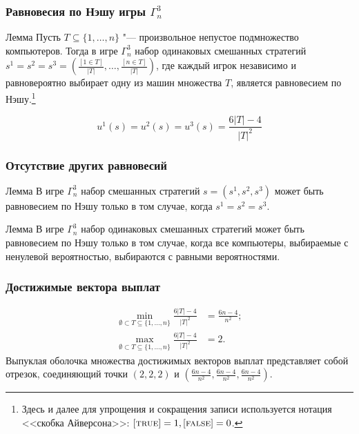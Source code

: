 \begin{frame}
	\frametitle{Равновесия по Нэшу игры $\Gamma^3_n$}
	\begin{block}{Лемма}
		Пусть $T \subseteq \{1, \ldots, n\}$ "--- произвольное непустое подмножество компьютеров. Тогда в игре $\Gamma^3_n$ набор одинаковых смешанных стратегий $s^1 = s^2 = s^3 = \left(\frac{[1 \in T]}{\left| T \right|}, \ldots, \frac{[n \in T]}{\left| T \right|}\right)$, где каждый игрок независимо и равновероятно выбирает одну из машин множества $T$, является равновесием по Нэшу.\footnote{Здесь и далее для упрощения и сокращения записи используется нотация <<скобка Айверсона>>: $[\textsc{true}] = 1, [\textsc{false}] = 0$.}
	\end{block}
	\begin{equation*}
		u^1(s) = u^2(s) = u^3(s) = \frac{6 \left| T \right| - 4}{\left| T \right|^2}
	\end{equation*}
\end{frame}

\begin{frame}
	\frametitle{Отсутствие других равновесий}
	\begin{block}{Лемма}
		В игре $\Gamma^3_n$ набор смешанных стратегий $s = (s^1, s^2, s^3)$ может быть равновесием по Нэшу только в том случае, когда $s^1 = s^2 = s^3$.
	\end{block}
	\begin{block}{Лемма}
		В игре $\Gamma^3_n$ набор одинаковых смешанных стратегий может быть равновесием по Нэшу только в том случае, когда все компьютеры, выбираемые с ненулевой вероятностью, выбираются с равными вероятностями.
	\end{block}
\end{frame}

\begin{frame}
	\frametitle{Достижимые вектора выплат}
	\begin{align*}
		\min_{\emptyset \subset T \subseteq \{1,\ldots,n\}} \frac{6 \left| T \right| - 4}{\left| T \right|^2} &= \frac{6 n - 4}{n^2};\\
		\max_{\emptyset \subset T \subseteq \{1,\ldots,n\}} \frac{6 \left| T \right| - 4}{\left| T \right|^2} &= 2.
	\end{align*}
	Выпуклая оболочка множества достижимых векторов выплат представляет собой отрезок, соединяющий точки $(2, 2, 2)$ и $(\frac{6 n - 4}{n^2}, \frac{6 n - 4}{n^2}, \frac{6 n - 4}{n^2})$.
\end{frame}

